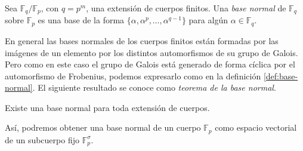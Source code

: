 \begin{definition}
  \label{def:base-normal}
  Sea \(\mathbb F_{q}/\mathbb F_p\), con \(q = p^m\), una extensión de cuerpos finitos. Una \emph{base normal} de \(\mathbb F_{q}\) sobre \(\mathbb F_p\) es una base de la forma \(\{\alpha, \alpha^p, \dots, \alpha^{q - 1}\}\) para algún \(\alpha \in \mathbb F_{q}\).
\end{definition}

En general las bases normales de los cuerpos finitos están formadas por las imágenes de un elemento por los distintos automorfismos de su grupo de Galois.
Pero como en este caso el grupo de Galois está generado de forma cíclica por el automorfismo de Frobenius, podemos expresarlo como en la definición \ref{def:base-normal}.
El siguiente resultado se conoce como \emph{teorema de la base normal}.

\begin{theorem}
  Existe una base normal para toda extensión de cuerpos.
\end{theorem}

Así, podremos obtener una base normal de un cuerpo \(\mathbb F_p\) como espacio vectorial de un subcuerpo fijo \(\mathbb F_p^{\sigma}\).

